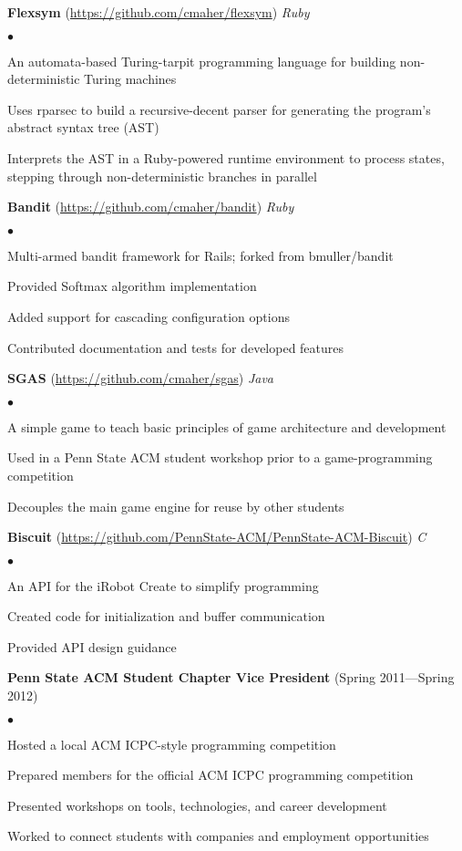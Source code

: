 \documentclass{article}
\newcommand{\project}[3]{{ \textbf{#1} (\url{#2}) \hfill \textit{#3} \\ }}
\newcommand{\activity}[2]{{ \textbf{#1} (#2) \hfill \\ }}
\newenvironment{achievements}{\begin{list}{$\bullet$}{\topsep 0pt \itemsep -2pt}}{\vspace*{4pt}\end{list}}
\begin{document}
\project{Flexsym}{https://github.com/cmaher/flexsym}{Ruby}
    \begin{achievements}
    \item An automata-based Turing-tarpit programming language for building non-deterministic Turing machines
    \item Uses rparsec to build a recursive-decent parser for generating the program's abstract syntax tree (AST)
    \item Interprets the AST in a Ruby-powered runtime environment to process states, stepping through non-deterministic branches in parallel
    \end{achievements}


\project{Bandit}{https://github.com/cmaher/bandit}{Ruby}
    \begin{achievements}
    \item Multi-armed bandit framework for Rails; forked from bmuller/bandit
    \item Provided Softmax algorithm implementation
    \item Added support for cascading configuration options
    \item Contributed documentation and tests for developed features
    \end{achievements}

    
\project{SGAS}{https://github.com/cmaher/sgas}{Java}
    \begin{achievements}
    \item A simple game to teach basic principles of game architecture and development
    \item Used in a Penn State ACM student workshop prior to a game-programming competition
    \item Decouples the main game engine for reuse by other students
    \end{achievements}


\project{Biscuit}{https://github.com/PennState-ACM/PennState-ACM-Biscuit}{C}
    \begin{achievements}
    \item An API for the iRobot Create to simplify programming
    \item Created code for initialization and buffer communication
    \item Provided API design guidance
    \end{achievements}


\activity{Penn State ACM Student Chapter Vice President}{Spring 2011---Spring 2012}
    \begin{achievements}
    \item Hosted a local ACM ICPC-style programming competition
    \item Prepared members for the official ACM ICPC programming competition
    \item Presented workshops on tools, technologies, and career development
    \item Worked to connect students with companies and employment opportunities
    \end{achievements}
\end{document}
